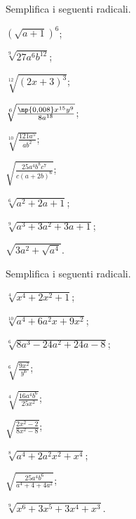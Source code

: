 \begin{esercizio}[\Ast]
 \label{ese:2.30}
Semplifica i seguenti radicali.
 \begin{multicols}{3}
 \begin{enumeratea}
 \item $\left(\sqrt{a+1}\right)^6$;
 \item $\sqrt[9]{27a^6b^{12}}$;
 \item $\sqrt[12]{(2x+3)^3}$;
 \item $\sqrt[6]{\frac{\np{0,008}x^{15}y^9}{8a^{18}}}$;
 \item $\sqrt[10]{\frac{121a^5}{ab^2}}$;
 \item $\sqrt{\frac{25a^4b^8c^7}{c(a+2b)^6}}$;
 \item $\sqrt[6]{a^2+2a+1}$;
 \item $\sqrt[9]{a^3+3a^2+3a+1}$;
 \item $\sqrt{3a^2+\sqrt{a^4}}$.
 \end{enumeratea}
 \end{multicols}
\end{esercizio}

\begin{esercizio}[\Ast]
 \label{ese:2.31}
Semplifica i seguenti radicali.
 \begin{multicols}{3}
 \begin{enumeratea}
 \item $\sqrt[4]{x^4+2x^2+1}$;
 \item $\sqrt[10]{a^4+6a^2x+9x^2}$;
 \item $\sqrt[6]{8a^3-24a^2+24a-8}$;
 \item $\sqrt[6]{\frac{9x^2}{y^6}}$;
 \item $\sqrt[4]{\frac{16a^4b^6}{25x^2}}$;
 \item $\sqrt{\frac{2x^2-2}{8x^2-8}}$;
 \item $\sqrt[8]{a^4+2a^2x^2+x^4}$;
 \item $\sqrt{\frac{25a^4b^6}{a^4+4+4a^2}}$;
 \item $\sqrt[9]{x^6+3x^5+3x^4+x^3}$.
 \end{enumeratea}
 \end{multicols}
\end{esercizio}

